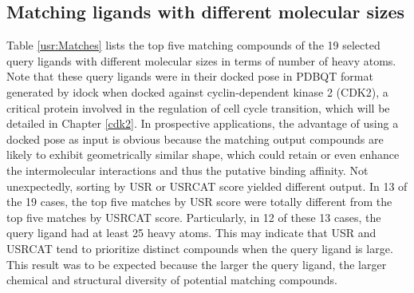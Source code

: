\subsection{Matching ligands with different molecular sizes}

Table \ref{usr:Matches} lists the top five matching compounds of the 19 selected query ligands with different molecular sizes in terms of number of heavy atoms. Note that these query ligands were in their docked pose in PDBQT format generated by idock \citep{1362} when docked against cyclin-dependent kinase 2 (CDK2), a critical protein involved in the regulation of cell cycle transition, which will be detailed in Chapter \ref{cdk2}. In prospective applications, the advantage of using a docked pose as input is obvious because the matching output compounds are likely to exhibit geometrically similar shape, which could retain or even enhance the intermolecular interactions and thus the putative binding affinity. Not unexpectedly, sorting by USR or USRCAT score yielded different output. In 13 of the 19 cases, the top five matches by USR score were totally different from the top five matches by USRCAT score. Particularly, in 12 of these 13 cases, the query ligand had at least 25 heavy atoms. This may indicate that USR and USRCAT tend to prioritize distinct compounds when the query ligand is large. This result was to be expected because the larger the query ligand, the larger chemical and structural diversity of potential matching compounds.

